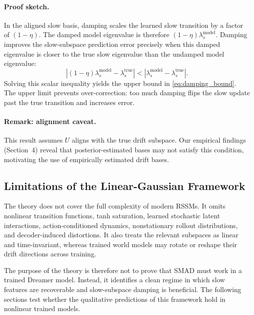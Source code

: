 \paragraph{Proof sketch.}
In the aligned slow basis, damping scales the learned slow transition by a
factor of $(1-\eta)$. The damped model eigenvalue is therefore
$(1-\eta)\lambda_s^{\mathrm{model}}$. Damping improves the slow-subspace
prediction error precisely when this damped eigenvalue is closer to the true
slow eigenvalue than the undamped model eigenvalue:
\begin{equation}
    \left|(1-\eta)\lambda_s^{\mathrm{model}}
    - \lambda_s^{\mathrm{true}}\right|
    <
    \left|\lambda_s^{\mathrm{model}}
    - \lambda_s^{\mathrm{true}}\right|.
\end{equation}
Solving this scalar inequality yields the upper bound in
\eqref{eq:damping_bound}. The upper limit prevents over-correction: too much
damping flips the slow update past the true transition and increases error.

\paragraph{Remark: alignment caveat.}
This result assumes $U$ aligns with the true drift subspace. Our empirical
findings (Section~4) reveal that posterior-estimated bases may not satisfy this
condition, motivating the use of empirically estimated drift bases.

\subsection{Limitations of the Linear-Gaussian Framework}

The theory does not cover the full complexity of modern RSSMs. It omits
nonlinear transition functions, tanh saturation, learned stochastic latent
interactions, action-conditioned dynamics, nonstationary rollout distributions,
and decoder-induced distortions. It also treats the relevant subspaces as
linear and time-invariant, whereas trained world models may rotate or reshape
their drift directions across training.

The purpose of the theory is therefore not to prove that SMAD must work in a
trained Dreamer model. Instead, it identifies a clean regime in which slow
features are recoverable and slow-subspace damping is beneficial. The following
sections test whether the qualitative predictions of this framework hold in
nonlinear trained models.
